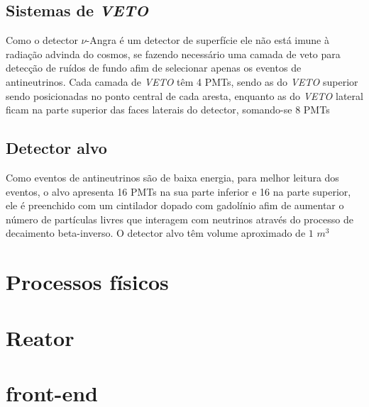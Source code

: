 \subsection{Sistemas de \textit{VETO}}

Como o detector $\nu$-Angra é um detector de superfície ele não está imune à radiação advinda do cosmos, se fazendo necessário uma camada de veto para detecção de ruídos de fundo afim de selecionar apenas os eventos de antineutrinos. Cada camada de \textit{VETO} têm 4 PMTs, sendo as do \textit{VETO} superior sendo posicionadas no ponto central de cada aresta, enquanto as do \textit{VETO} lateral ficam na parte superior das faces laterais do detector, somando-se 8 PMTs 

\subsection{Detector alvo}

Como eventos de antineutrinos são de baixa energia, para melhor leitura dos eventos, o alvo apresenta 16 PMTs na sua parte inferior e 16 na parte superior, ele é preenchido com um cintilador dopado com gadolínio afim de aumentar o número de partículas livres que interagem com neutrinos através do processo de decaimento beta-inverso. O detector alvo têm volume aproximado de $1$ $m^3$

\section{Processos físicos}

\section{Reator}

\section{front-end}
